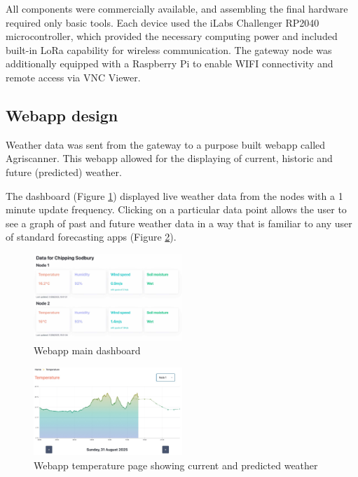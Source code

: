 \documentclass[conference]{IEEEtran}
\begin{document}
All components were commercially available, and assembling the final hardware
required only basic tools. Each device used the iLabs Challenger RP2040
microcontroller, which provided the necessary computing power and included
built-in LoRa capability for wireless communication. The gateway node was
additionally equipped with a Raspberry Pi to enable WIFI connectivity and remote
access via VNC Viewer.

\subsection{Webapp design}

Weather data was sent from the gateway to a purpose built webapp called
Agriscanner. This webapp allowed for the displaying of current, historic and
future (predicted) weather.

The dashboard (Figure \ref{dashboard}) displayed live weather data from the
nodes with a 1 minute update frequency. Clicking on a particular data point
allows the user to see a graph of past and future weather data in a way that is
familiar to any user of standard forecasting apps (Figure \ref{temperature}).

\begin{figure}[htbp]
\centerline{\includegraphics[width=0.5\textwidth]{figures/main-page.jpg}}
\caption{Webapp main dashboard}
\label{dashboard}
\end{figure}

\begin{figure}[htbp]
\centerline{\includegraphics[width=0.5\textwidth]{figures/temperature-node-one.jpg}}
\caption{Webapp temperature page showing current and predicted weather}
\label{temperature}
\end{figure}
\end{document}
